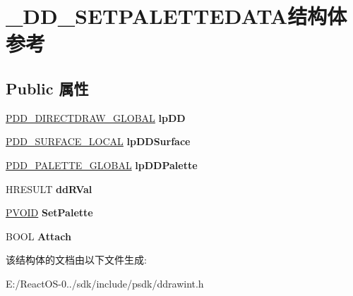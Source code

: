 \hypertarget{struct___d_d___s_e_t_p_a_l_e_t_t_e_d_a_t_a}{}\section{\+\_\+\+D\+D\+\_\+\+S\+E\+T\+P\+A\+L\+E\+T\+T\+E\+D\+A\+T\+A结构体 参考}
\label{struct___d_d___s_e_t_p_a_l_e_t_t_e_d_a_t_a}
\subsection*{Public 属性}
\begin{DoxyCompactItemize}
\item 
\mbox{\label{struct___d_d___s_e_t_p_a_l_e_t_t_e_d_a_t_a_a70da0d4d525eb7b7e3f0a2a99b90e2dd}} 
\hyperlink{struct___d_d___d_i_r_e_c_t_d_r_a_w___g_l_o_b_a_l}{P\+D\+D\+\_\+\+D\+I\+R\+E\+C\+T\+D\+R\+A\+W\+\_\+\+G\+L\+O\+B\+AL} {\bfseries lp\+DD}
\item 
\mbox{\label{struct___d_d___s_e_t_p_a_l_e_t_t_e_d_a_t_a_a9ce8485c6bf8f5acf541cdc730c714a6}} 
\hyperlink{struct___d_d___s_u_r_f_a_c_e___l_o_c_a_l}{P\+D\+D\+\_\+\+S\+U\+R\+F\+A\+C\+E\+\_\+\+L\+O\+C\+AL} {\bfseries lp\+D\+D\+Surface}
\item 
\mbox{\label{struct___d_d___s_e_t_p_a_l_e_t_t_e_d_a_t_a_a737c0c1901191eeba7ee3b70d6e8eaeb}} 
\hyperlink{struct___d_d___p_a_l_e_t_t_e___g_l_o_b_a_l}{P\+D\+D\+\_\+\+P\+A\+L\+E\+T\+T\+E\+\_\+\+G\+L\+O\+B\+AL} {\bfseries lp\+D\+D\+Palette}
\item 
\mbox{\label{struct___d_d___s_e_t_p_a_l_e_t_t_e_d_a_t_a_a595f0d1d4ee37f21ef5e9b3843cff0a7}} 
H\+R\+E\+S\+U\+LT {\bfseries dd\+R\+Val}
\item 
\mbox{\label{struct___d_d___s_e_t_p_a_l_e_t_t_e_d_a_t_a_a0ec808164018c3d60ca5a02d225c4ab9}} 
\hyperlink{interfacevoid}{P\+V\+O\+ID} {\bfseries Set\+Palette}
\item 
\mbox{\label{struct___d_d___s_e_t_p_a_l_e_t_t_e_d_a_t_a_abca70ddfd6145b056e21755abe2b381c}} 
B\+O\+OL {\bfseries Attach}
\end{DoxyCompactItemize}


该结构体的文档由以下文件生成\+:\begin{DoxyCompactItemize}
\item 
E\+:/\+React\+O\+S-\/0../sdk/include/psdk/ddrawint.\+h\end{DoxyCompactItemize}

